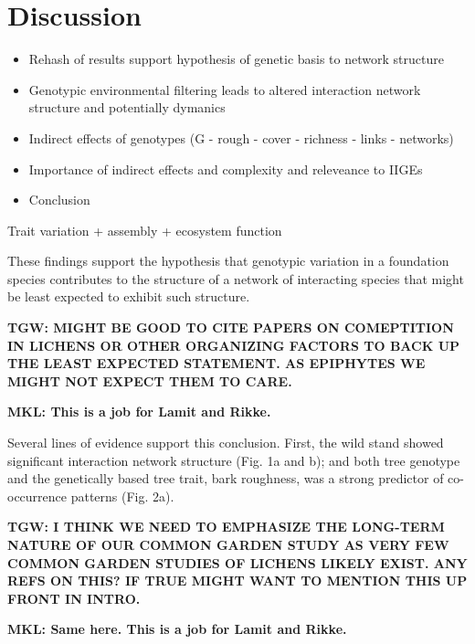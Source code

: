 \documentclass[9pt,twocolumn,twoside,lineno]{pnas-new}
\begin{document}
\section*{Discussion}

\begin{itemize}
\item Rehash of results support hypothesis of genetic basis to network structure
\item Genotypic environmental filtering leads to altered interaction
  network structure and potentially dymanics
\item Indirect effects of genotypes (G - rough - cover - richness -
  links - networks)
\item Importance of indirect effects and complexity and releveance to IIGEs
\item Conclusion
\end{itemize}



Trait variation + assembly + ecosystem function

These findings support the hypothesis that genotypic variation in a
foundation species contributes to the structure of a network of
interacting species that might be least expected to exhibit such
structure. 

\textbf{TGW: MIGHT BE GOOD TO CITE PAPERS ON COMEPTITION IN LICHENS OR
OTHER ORGANIZING FACTORS TO BACK UP THE LEAST EXPECTED STATEMENT.  AS
EPIPHYTES WE MIGHT NOT EXPECT THEM TO CARE.}

\textbf{MKL: This is a job for Lamit and Rikke.}

Several lines of evidence support this conclusion. First, the wild
stand showed significant interaction network structure (Fig. 1a and
b); and both tree genotype and the genetically based tree trait, bark
roughness, was a strong predictor of co-occurrence patterns
(Fig. 2a). 

\textbf{TGW: I THINK WE NEED TO EMPHASIZE THE LONG-TERM NATURE OF OUR
COMMON GARDEN STUDY AS VERY FEW COMMON GARDEN STUDIES OF LICHENS
LIKELY EXIST. ANY REFS ON THIS? IF TRUE MIGHT WANT TO MENTION THIS UP
FRONT IN INTRO.}

\textbf{MKL: Same here. This is a job for Lamit and Rikke.}
\end{document}
